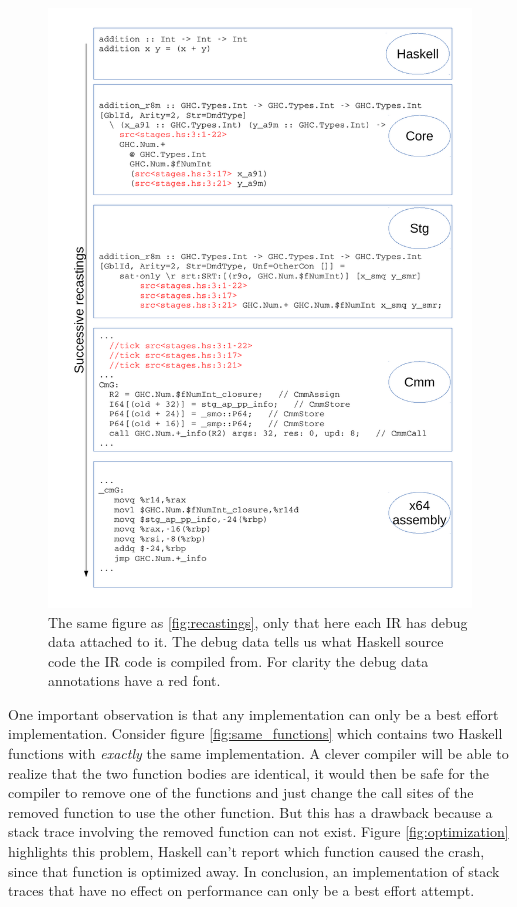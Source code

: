 \begin{figure}
\begin{mdframed}
  \centering
  \includegraphics[width=5.4in]{fig/recastings_ticks}
  \caption{The same figure as \ref{fig:recastings}, only that here each
  IR has debug data attached to it. The debug data tells us what Haskell
  source code the IR code is compiled from. For clarity the debug data
  annotations have a red font.}
  \label{fig:recastings_ticks}
\end{mdframed}
\end{figure}

One important observation is that
any implementation can only be a best effort implementation.
Consider figure \ref{fig:same_functions} which contains two Haskell functions
with \emph{exactly} the same implementation. A clever compiler will
be able to realize that the two function bodies are identical,
it would then be safe for the compiler to remove one of the functions
and just change the call sites of the removed function to use the other function.
But this has a drawback because a stack trace
involving the removed function can not exist. Figure
\ref{fig:optimization} highlights this problem, Haskell can't
report which function caused the crash, since that
function is optimized away. In conclusion, an implementation of stack traces that have no
effect on performance can only be a best effort attempt.

